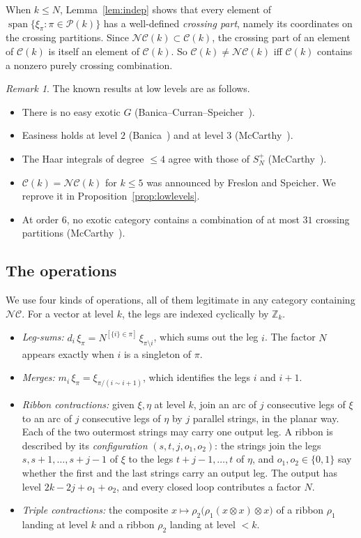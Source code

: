 \documentclass[11pt]{amsart}
\theoremstyle{definition}
\theoremstyle{remark}
\newtheorem{remark}[theorem]{Remark}
\theoremstyle{plain}
\numberwithin{equation}{section}
\numberwithin{table}{section}
\newcommand{\Z}{\mathbb Z}
\newcommand{\NC}{\mathcal{NC}}
\newcommand{\Pp}{\mathcal{P}}
\DeclareMathOperator{\spn}{span}
\begin{document}
When $k\le N$, Lemma~\ref{lem:indep} shows that every element of $\spn\{\xi_\pi:\pi\in\Pp(k)\}$ has a well-defined \emph{crossing part}, namely its coordinates on the crossing partitions. Since $\NC(k)\subset\mathcal C(k)$, the crossing part of an element of $\mathcal C(k)$ is itself an element of $\mathcal C(k)$. So $\mathcal C(k)\ne\NC(k)$ iff $\mathcal C(k)$ contains a nonzero purely crossing combination.

\begin{remark}\label{rem:known}
The known results at low levels are as follows.
\begin{itemize}
\item There is no easy exotic $G$ (Banica--Curran--Speicher~\cite{bcs}).
\item Easiness holds at level $2$ (Banica~\cite{bah}) and at level $3$ (McCarthy~\cite{mc1}).
\item The Haar integrals of degree $\le4$ agree with those of $S_N^+$ (McCarthy~\cite{mc1}).
\item $\mathcal C(k)=\NC(k)$ for $k\le5$ was announced by Freslon and Speicher. We reprove it in Proposition~\ref{prop:lowlevels}.
\item At order $6$, no exotic category contains a combination of at most $31$ crossing partitions (McCarthy~\cite{mc2}).
\end{itemize}
\end{remark}

\subsection{The operations}

We use four kinds of operations, all of them legitimate in any category containing $\NC$. For a vector at level $k$, the legs are indexed cyclically by $\Z_k$.

\begin{itemize}
\item \emph{Leg-sums:} $d_i\,\xi_\pi=N^{[\{i\}\in\pi]}\,\xi_{\pi\setminus i}$, which sums out the leg $i$. The factor $N$ appears exactly when $i$ is a singleton of $\pi$.
\item \emph{Merges:} $m_i\,\xi_\pi=\xi_{\pi/(i\sim i+1)}$, which identifies the legs $i$ and $i+1$.
\item \emph{Ribbon contractions:} given $\xi,\eta$ at level $k$, join an arc of $j$ consecutive legs of $\xi$ to an arc of $j$ consecutive legs of $\eta$ by $j$ parallel strings, in the planar way. Each of the two outermost strings may carry one output leg. A ribbon is described by its \emph{configuration} $(s,t,j,o_1,o_2)$: the strings join the legs $s,s+1,\dots,s+j-1$ of $\xi$ to the legs $t+j-1,\dots,t$ of $\eta$, and $o_1,o_2\in\{0,1\}$ say whether the first and the last strings carry an output leg. The output has level $2k-2j+o_1+o_2$, and every closed loop contributes a factor $N$.
\item \emph{Triple contractions:} the composite $x\mapsto\rho_2\big(\rho_1(x\otimes x)\otimes x\big)$ of a ribbon $\rho_1$ landing at level $k$ and a ribbon $\rho_2$ landing at level $<k$.
\end{itemize}
\end{document}

